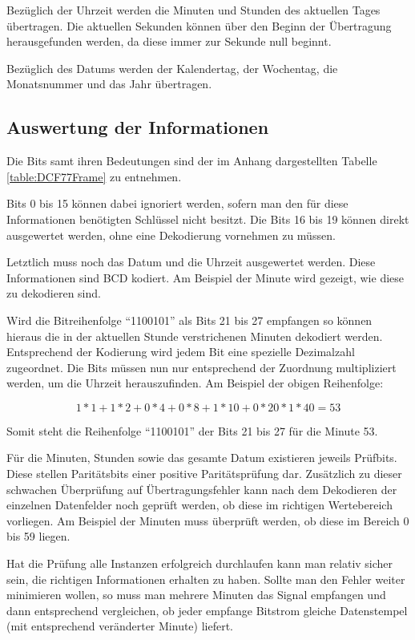 			Bezüglich der Uhrzeit werden die Minuten und Stunden des aktuellen Tages übertragen. Die aktuellen Sekunden können über den Beginn der Übertragung herausgefunden werden, da diese immer zur Sekunde null beginnt.
			
			Bezüglich des Datums werden der Kalendertag, der Wochentag, die Monatsnummer und das Jahr übertragen.
			
			\cite{DCF77Wiki}
		\subsection{Auswertung der Informationen}
			Die Bits samt ihren Bedeutungen sind der im Anhang dargestellten Tabelle \ref{table:DCF77Frame} zu entnehmen.
			
			Bits 0 bis 15 können dabei ignoriert werden, sofern man den für diese Informationen benötigten Schlüssel nicht besitzt.
			Die Bits 16 bis 19 können direkt ausgewertet werden, ohne eine Dekodierung vornehmen zu müssen.
			
			Letztlich muss noch das Datum und die Uhrzeit ausgewertet werden. Diese Informationen sind BCD kodiert. Am Beispiel der Minute wird gezeigt, wie diese zu dekodieren sind.
			
			Wird die Bitreihenfolge \enquote{1100101} als Bits 21 bis 27 empfangen so können hieraus die in der aktuellen Stunde verstrichenen Minuten dekodiert werden. Entsprechend der Kodierung wird jedem Bit eine spezielle Dezimalzahl zugeordnet. Die Bits müssen nun nur entsprechend der Zuordnung multipliziert werden, um die Uhrzeit herauszufinden. Am Beispiel der obigen Reihenfolge:
			
			\[ 1*1+1*2+0*4+0*8+1*10+0*20*1*40 = 53 \]
			
			Somit steht die Reihenfolge \enquote{1100101} der Bits 21 bis 27 für die Minute 53.
			
			Für die Minuten, Stunden sowie das gesamte Datum existieren jeweils Prüfbits. Diese stellen Paritätsbits einer positive Paritätsprüfung dar. Zusätzlich zu dieser schwachen Überprüfung auf Übertragungsfehler kann nach dem Dekodieren der einzelnen Datenfelder noch geprüft werden, ob diese im richtigen Wertebereich vorliegen. Am Beispiel der Minuten muss überprüft werden, ob diese im Bereich 0 bis 59 liegen.
			
			Hat die Prüfung alle Instanzen erfolgreich durchlaufen kann man relativ sicher sein, die richtigen Informationen erhalten zu haben. Sollte man den Fehler weiter minimieren wollen, so muss man mehrere Minuten das Signal empfangen und dann entsprechend vergleichen, ob jeder empfange Bitstrom gleiche Datenstempel (mit entsprechend veränderter Minute) liefert.
			
